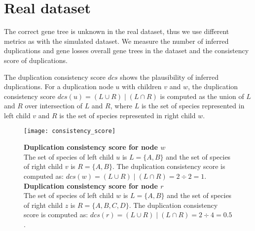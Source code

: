 \section{Real dataset}

The correct gene tree is unknown in the real dataset, thus we use different metrics as with the simulated dataset. We measure the number of inferred duplications and gene losses overall gene trees in the dataset and the consistency score of duplications.

The duplication consistency score $dcs$ shows the plausibility of inferred duplications. For a duplication node $u$ with children $v$ and $w$, the duplication consistency score $dcs(u) = (L \cup R) \mid (L \cap R)$ is computed as the union of $L$ and $R$ over intersection of $L$ and $R$, where $L$ is the set of species represented in left child $v$ and $R$ is the set of species represented in right child $w$.

\begin{figure}[ht!]
	\centering
	\label{consistency_score}
  	\texttt{[image: consistency\_score]}
  	\caption[Duplication consistency score]{\textbf{Duplication consistency score for node $w$}\\
  	The set of species of left child $u$ is $L = \{A, B\}$ and the set of species of right child $v$ is $R = \{A, B\}$. The duplication consistency score is computed as: $dcs(w) = (L \cup R) \mid (L \cap R) = 2 \div 2 = 1$.
  	\\
  	\textbf{Duplication consistency score for node $r$}\\
  	The set of species of left child $w$ is $L = \{A, B\}$ and the set of species of right child $z$ is $R = \{A, B, C, D\}$. The duplication consistency score is computed as: $dcs(r) = (L \cup R) \mid (L \cap R) = 2 \div 4 = 0.5$.}
\end{figure}


